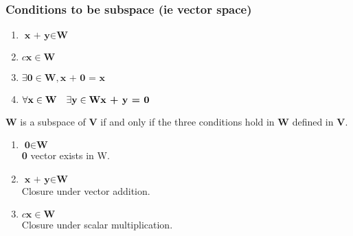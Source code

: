\documentclass[11pt]{scrartcl}
\begin{document}
\subsubsection{Conditions to be subspace (ie vector space)}
\begin{enumerate}[label=\alph*.]
	\item{$\textbf{x + y} \in \textbf{W}$}
	\item{$c\textbf{x} \in \textbf{W}$}
	\item{$\exists \textbf{0} \in \textbf{W}, \textbf{x + 0 = x}$}
	\item{$\forall \textbf{x} \in \textbf{W} \quad \exists \textbf{y} \in \textbf{W} \\ \textbf{x + y = 0}$ }
\end{enumerate}

\begin{theorem*}
	\textbf{W} is a subspace of \textbf{V} if and only if the three conditions hold in \textbf{W} defined in \textbf{V}.
\begin{enumerate}[label=\alph*.]
	\item{$\textbf{0} \in \textbf{W}$ \\ \textbf{0} vector exists in W.}
	\item{$\textbf{x + y} \in \textbf{W}$ \\ Closure under vector addition.}
	\item{$c\textbf{x} \in \textbf{W}$ \\ Closure under scalar multiplication.}
\end{enumerate}
\end{theorem*}
\end{document}
